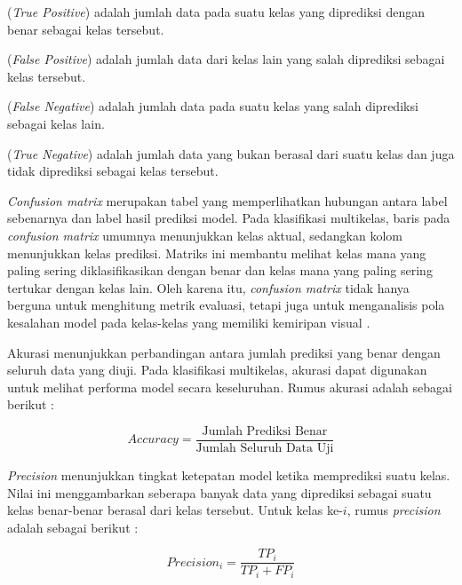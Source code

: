 \begin{sectioncontent}
\begin{subsectioncontent}
        \begin{description}[leftmargin=0.75cm]
            \item[$TP$] (\textit{True Positive}) adalah jumlah data pada suatu kelas yang diprediksi dengan benar sebagai kelas tersebut.
            \item[$FP$] (\textit{False Positive}) adalah jumlah data dari kelas lain yang salah diprediksi sebagai kelas tersebut.
            \item[$FN$] (\textit{False Negative}) adalah jumlah data pada suatu kelas yang salah diprediksi sebagai kelas lain.
            \item[$TN$] (\textit{True Negative}) adalah jumlah data yang bukan berasal dari suatu kelas dan juga tidak diprediksi sebagai kelas tersebut.
        \end{description}

        \textit{Confusion matrix} merupakan tabel yang memperlihatkan hubungan antara label sebenarnya dan label hasil prediksi model. Pada klasifikasi multikelas, baris pada \textit{confusion matrix} umumnya menunjukkan kelas aktual, sedangkan kolom menunjukkan kelas prediksi. Matriks ini membantu melihat kelas mana yang paling sering diklasifikasikan dengan benar dan kelas mana yang paling sering tertukar dengan kelas lain. Oleh karena itu, \textit{confusion matrix} tidak hanya berguna untuk menghitung metrik evaluasi, tetapi juga untuk menganalisis pola kesalahan model pada kelas-kelas yang memiliki kemiripan visual \citep{grandini2020metrics}.


        Akurasi menunjukkan perbandingan antara jumlah prediksi yang benar dengan seluruh data yang diuji. Pada klasifikasi multikelas, akurasi dapat digunakan untuk melihat performa model secara keseluruhan. Rumus akurasi adalah sebagai berikut \citep{grandini2020metrics}:

        \begin{equation}
            Accuracy = \frac{\text{Jumlah Prediksi Benar}}{\text{Jumlah Seluruh Data Uji}}
        \end{equation}

        \textit{Precision} menunjukkan tingkat ketepatan model ketika memprediksi suatu kelas. Nilai ini menggambarkan seberapa banyak data yang diprediksi sebagai suatu kelas benar-benar berasal dari kelas tersebut. Untuk kelas ke-$i$, rumus \textit{precision} adalah sebagai berikut \citep{powers2011evaluation,grandini2020metrics}:

        \begin{equation}
            Precision_{i} = \frac{TP_{i}}{TP_{i} + FP_{i}}
        \end{equation}


\end{subsectioncontent}
\end{sectioncontent}
